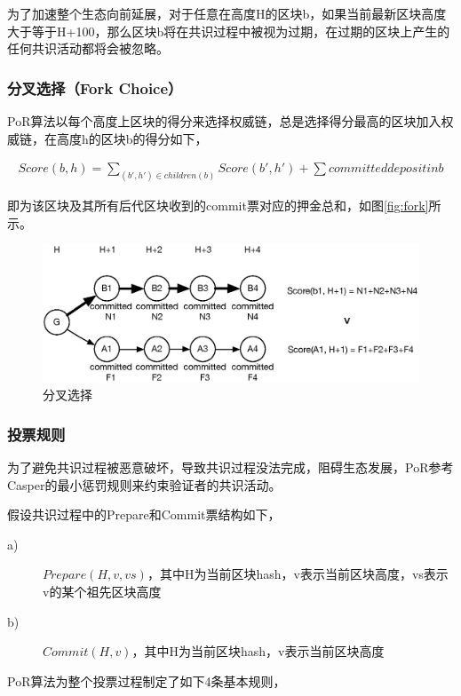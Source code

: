 为了加速整个生态向前延展，对于任意在高度H的区块b，如果当前最新区块高度大于等于H+100，那么区块b将在共识过程中被视为过期，在过期的区块上产生的任何共识活动都将会被忽略。

\subsubsection{分叉选择（Fork Choice）}
\label{por:design:fork}

PoR算法以每个高度上区块的得分来选择权威链，总是选择得分最高的区块加入权威链，在高度h的区块b的得分如下，

\begin{align}
Score(b, h) = \sum_{(b',h') \in children(b)}Score(b', h') + \sum committed deposit in b
\end{align}

即为该区块及其所有后代区块收到的commit票对应的押金总和，如图\ref{fig:fork}所示。

\begin{figure}[h]
\centering
\includegraphics[width=12cm]{./figs/fork}
\caption{分叉选择}
\label{fig:fork_choice}
\end{figure}

\subsubsection{投票规则}
\label{por:design:vote}

为了避免共识过程被恶意破坏，导致共识过程没法完成，阻碍生态发展，PoR参考Casper的最小惩罚规则来约束验证者的共识活动。

假设共识过程中的Prepare和Commit票结构如下，
\begin{description}
\item[a)] $Prepare(H, v, vs)$，其中H为当前区块hash，v表示当前区块高度，vs表示v的某个祖先区块高度
\item[b)] $Commit(H, v)$，其中H为当前区块hash，v表示当前区块高度
\end{description}

PoR算法为整个投票过程制定了如下4条基本规则，

